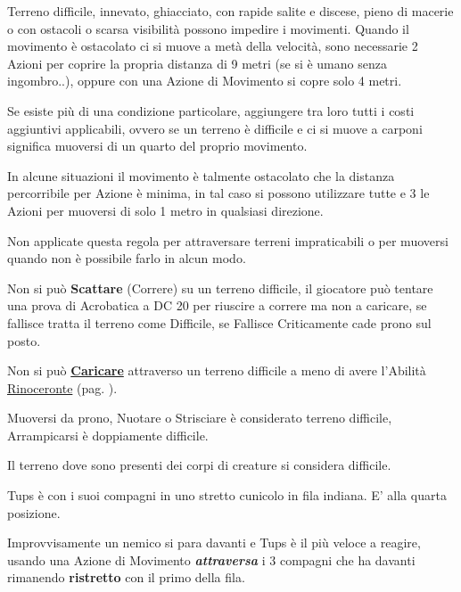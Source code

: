 \begin{multicols}{2}
Terreno difficile, innevato, ghiacciato, con rapide salite e discese, pieno di macerie o con ostacoli o scarsa visibilità possono impedire i movimenti. Quando il movimento è ostacolato ci si muove a metà della velocità, sono necessarie 2 Azioni per coprire la propria distanza di 9 metri (se si è umano senza ingombro..), oppure con una Azione di Movimento si copre solo 4 metri.

Se esiste più di una condizione particolare, aggiungere tra loro tutti i costi aggiuntivi applicabili, ovvero se un terreno è difficile e ci si muove a carponi significa muoversi di un quarto del proprio movimento. 

In alcune situazioni il movimento è talmente ostacolato che la distanza percorribile per Azione è minima, in tal caso si possono utilizzare tutte e 3 le Azioni per muoversi di solo 1 metro in qualsiasi direzione.

Non applicate questa regola per attraversare terreni impraticabili o per muoversi quando non è possibile farlo in alcun modo.

Non si può \textbf{Scattare} (Correre) su un terreno difficile, il giocatore può tentare una prova di Acrobatica a DC 20 per riuscire a correre ma non a caricare, se fallisce tratta il terreno come Difficile, se Fallisce Criticamente cade prono sul posto. 

Non si può \hyperlink{carica}{\textbf{Caricare}} attraverso un terreno difficile a meno di avere l'Abilità \hyperlink{Rinoceronte}{Rinoceronte} (pag. \pageref{Rinoceronte}).

Muoversi da prono, Nuotare o Strisciare è considerato terreno difficile, Arrampicarsi è doppiamente difficile.

Il terreno dove sono presenti dei corpi di creature si considera difficile. 

\begin{changemargin}{0.3cm}{0.3cm}\begin{tcolorbox}[title = Tups nel cunicolo] %
Tups è con i suoi compagni in uno stretto cunicolo in fila indiana. E' alla quarta posizione.

Improvvisamente un nemico si para davanti e Tups è il più veloce a reagire, usando una Azione di Movimento \emph{\textbf{attraversa}} i 3 compagni che ha davanti rimanendo \textbf{ristretto} con il primo della fila.


\end{tcolorbox}
\end{changemargin}
\end{multicols}
